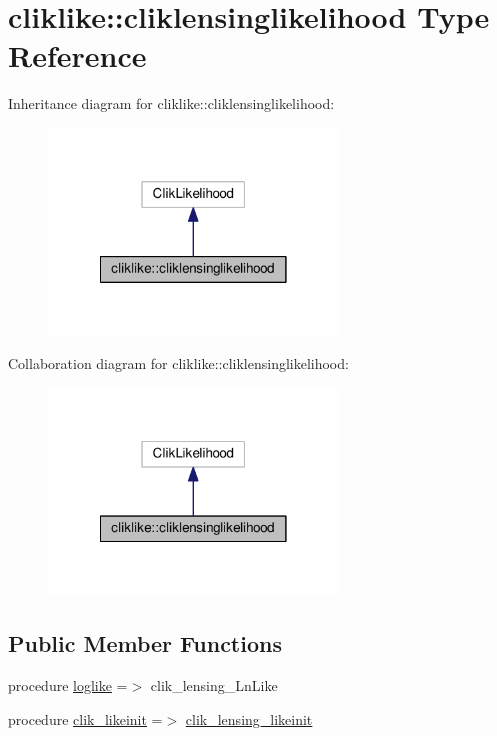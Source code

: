 \hypertarget{structcliklike_1_1cliklensinglikelihood}{}\section{cliklike\+:\+:cliklensinglikelihood Type Reference}
\label{structcliklike_1_1cliklensinglikelihood}


Inheritance diagram for cliklike\+:\+:cliklensinglikelihood\+:
\nopagebreak
\begin{figure}[H]
\begin{center}
\leavevmode
\includegraphics[width=218pt]{structcliklike_1_1cliklensinglikelihood__inherit__graph}
\end{center}
\end{figure}


Collaboration diagram for cliklike\+:\+:cliklensinglikelihood\+:
\nopagebreak
\begin{figure}[H]
\begin{center}
\leavevmode
\includegraphics[width=218pt]{structcliklike_1_1cliklensinglikelihood__coll__graph}
\end{center}
\end{figure}
\subsection*{Public Member Functions}
\begin{DoxyCompactItemize}
\item 
procedure \mbox{\hyperlink{structcliklike_1_1cliklensinglikelihood_a12ec49fc557e262c9ac8319c9392ddd6}{loglike}} =$>$ clik\+\_\+lensing\+\_\+\+Ln\+Like
\item 
procedure \mbox{\hyperlink{structcliklike_1_1cliklensinglikelihood_ac4a38b9586c81e8e9c036b3891e5f5c3}{clik\+\_\+likeinit}} =$>$ \mbox{\hyperlink{namespacecliklike_af1724949f007a273de7b121db709494d}{clik\+\_\+lensing\+\_\+likeinit}}
\end{DoxyCompactItemize}

